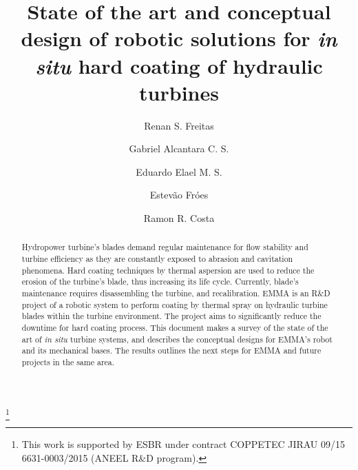 \documentclass[twocolumn]{svjour3}
\begin{document}

\title{State of the art and conceptual design of robotic solutions for
\textit{in situ} hard coating of hydraulic turbines}%



\author{Renan S. Freitas \and
		Gabriel Alcantara C. S. \and
		Eduardo Elael M. S. \and
		Estevão Fróes \and
		Ramon R. Costa}


\thanks{This work is supported by ESBR under contract COPPETEC
JIRAU 09/15 6631-0003/2015 (ANEEL R\&D program).}

\maketitle
  
\begin{abstract}      
Hydropower turbine's blades demand regular maintenance for flow stability and
turbine efficiency as they are constantly exposed to abrasion and cavitation
phenomena. Hard coating techniques by thermal aspersion are used to reduce the
erosion of the turbine's blade, thus increasing its life cycle. Currently,
blade's maintenance requires disassembling the turbine, and recalibration. EMMA
is an R\&D project of a robotic system to perform coating by thermal spray on
hydraulic turbine blades within the turbine environment. The project aims to
significantly reduce the downtime for hard coating process. This document
makes a survey of the state of the art of \textit{in situ} turbine systems, and
describes the conceptual designs for EMMA's robot and its
mechanical bases. The results outlines the next steps for EMMA and future
projects in the same area. 

\end{abstract} 

 





  
 
\end{document}
